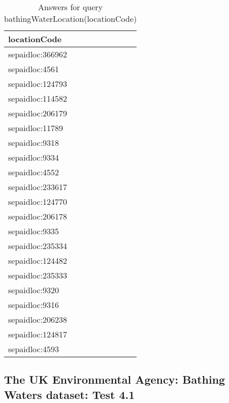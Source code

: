 \documentclass[a4paper,10pt]{article}
\begin{document}
\begin{table}
\caption{Answers for query bathingWaterLocation(locationCode) }		
\begin{center}
\begin{tabular}{ l }
\hline
locationCode \\ \hline
 sepaidloc:366962 \\
 sepaidloc:4561   \\
 sepaidloc:124793 \\
 sepaidloc:114582 \\
 sepaidloc:206179 \\
 sepaidloc:11789  \\
sepaidloc:9318   \\
 sepaidloc:9334   \\
 sepaidloc:4552   \\
 sepaidloc:233617 \\
 sepaidloc:124770 \\
 sepaidloc:206178 \\
 sepaidloc:9335   \\
 sepaidloc:235334 \\
 sepaidloc:124482 \\
 sepaidloc:235333 \\
 sepaidloc:9320   \\
 sepaidloc:9316   \\
 sepaidloc:206238 \\
 sepaidloc:124817 \\
 sepaidloc:4593   

\end{tabular}
\label{bathingWaterLocation(locationCode)}
\end{center}
\end{table}
 













\subsection{The UK Environmental Agency: Bathing Waters dataset: Test 4.1}
\label{Test 4.1}
\end{document}
